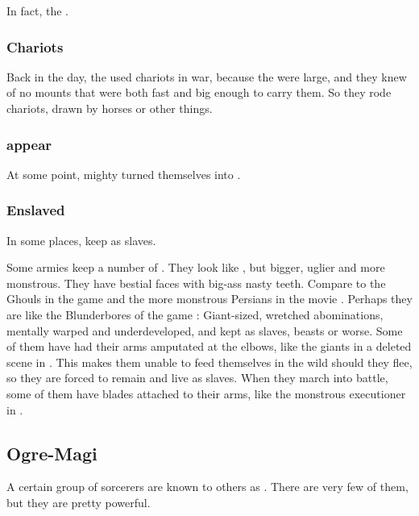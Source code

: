In fact, the \ophidians{} . 





\subsubsection{Chariots}
Back in the day, the \nephilim{} used chariots in war, because the \nephilim{} were large, and they knew of no mounts that were both fast and big enough to carry them. So they rode chariots, drawn by horses or other things.





\subsubsection{\Aryothim{} appear}
At some point, mighty \nephilim{} turned themselves into . 





\subsubsection{Enslaved}
In some places, \humans keep \nephilim{} as slaves. 

Some \human armies keep a number of \nephil {}. 
They look like \humans, but bigger, uglier and more monstrous. 
They have bestial faces with big-ass nasty teeth. 
Compare to the Ghouls in the game \cite{VideoGame:WarcraftIII} and the more monstrous Persians in the movie \cite{Movie:300}. 
Perhaps they are like the Blunderbores of the game \cite{VideoGame:DiabloII}: 
Giant-sized, wretched abominations, mentally warped and underdeveloped, and kept as slaves, beasts or worse. 
Some of them have had their arms amputated at the elbows, like the giants in a deleted scene in \cite{Movie:300}. This makes them unable to feed themselves in the wild should they flee, so they are forced to remain and live as slaves. 
When they march into battle, some of them have blades attached to their arms, like the monstrous executioner in \cite{Movie:300}.








\subsection{Ogre-Magi}
A certain group of \nephilic{} sorcerers are known to others as . There are very few of them, but they are pretty powerful.









